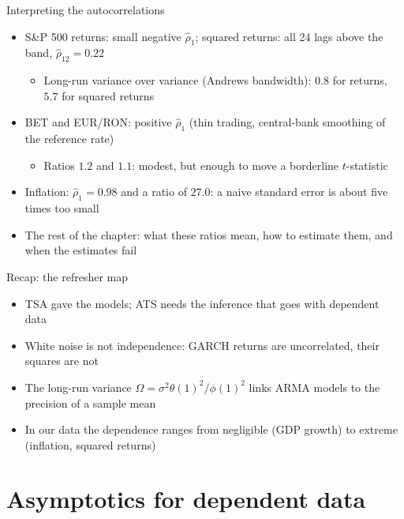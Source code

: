 \begin{frame}{Interpreting the autocorrelations}
\itemsize{\small}
\begin{itemize}
    \item S\&P 500 returns: small negative $\hat\rho_1$; squared returns: all 24 lags above the band, $\hat\rho_{12} = 0.22$
    \begin{itemize}
        \item Long-run variance over variance (Andrews bandwidth): $0.8$ for returns, $5.7$ for squared returns
    \end{itemize}
    \item BET and EUR/RON: positive $\hat\rho_1$ (thin trading, central-bank smoothing of the reference rate)
    \begin{itemize}
        \item Ratios $1.2$ and $1.1$: modest, but enough to move a borderline $t$-statistic
    \end{itemize}
    \item Inflation: $\hat\rho_1 = 0.98$ and a ratio of $27.0$: a naive standard error is about five times too small
    \item The rest of the chapter: what these ratios mean, how to estimate them, and when the estimates fail
\end{itemize}
\end{frame}

\begin{frame}{Recap: the refresher map}
\itemsize{\small}
\begin{itemize}
    \item TSA gave the models; ATS needs the inference that goes with dependent data
    \item White noise is not independence: GARCH returns are uncorrelated, their squares are not
    \item The long-run variance $\Omega = \sigma^2\theta(1)^2/\phi(1)^2$ links ARMA models to the precision of a sample mean
    \item In our data the dependence ranges from negligible (GDP growth) to extreme (inflation, squared returns)
\end{itemize}
\end{frame}


\section{Asymptotics for dependent data}

